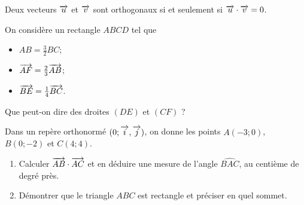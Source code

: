 \documentclass[11pt]{article}
\begin{document}
\begin{prop}
  Deux vecteurs $\overrightarrow{u}$ et $\overrightarrow{v}$ sont orthogonaux si et seulement si
  $\overrightarrow{u}\cdot\overrightarrow{v}=0$.
\end{prop}
\begin{app}
  \begin{minipage}{.5\textwidth}
    On considère un rectangle $ABCD$ tel que
    \begin{itemize}
      \item $AB=\frac{3}{2}BC$;
      \item $\overrightarrow{AF}=\frac{2}{3}\overrightarrow{AB}$;
      \item $\overrightarrow{BE}=\frac{1}{4}\overrightarrow{BC}$.
    \end{itemize} Que
    peut-on dire des droites $(DE)$ et $(CF)$ ?
  \end{minipage}
  \begin{minipage}{.5\textwidth}
    \begin{center}
    \end{center}
  \end{minipage}
\end{app}

\begin{app}
  Dans un repère orthonormé $(0; \overrightarrow{i}, \overrightarrow{j})$, on donne les points
  $A(-3;0)$, $B(0;-2)$ et $C(4;4)$.
  \begin{enumerate}
    \item Calculer $\overrightarrow{AB}\cdot\overrightarrow{AC}$ et en déduire une mesure de l'angle
      $\widehat{BAC}$, au centième de degré près.
    \item Démontrer que le triangle $ABC$ est rectangle et préciser en quel
      sommet.
  \end{enumerate}
\end{app}
\end{document}
